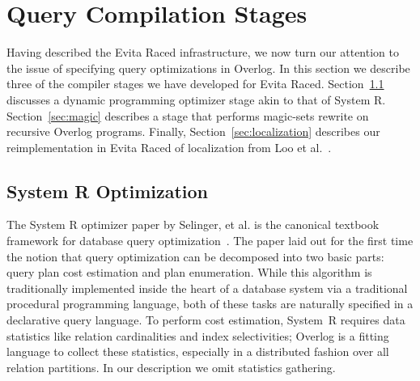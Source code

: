 \section{Query Compilation Stages}
\label{sec:rewrite}

Having described the Evita Raced infrastructure, we now turn our
attention to the issue of specifying query optimizations in Overlog.  In
this section we  describe three of the compiler stages we have developed
for Evita Raced. 
Section~\ref{sec:systemr} discusses a dynamic programming optimizer stage akin to that of
System R. Section~\ref{sec:magic} describes a stage that performs 
magic-sets rewrite on recursive Overlog programs.
Finally, Section~\ref{sec:localization} describes our
reimplementation in Evita Raced of localization  from Loo et
al.~\cite{loo-sigmod06}. 

\subsection{System R Optimization}
\label{sec:systemr}

The System R optimizer paper by Selinger, et al. is the canonical textbook framework for database query optimization~\cite{selinger}.  The paper laid out for
the first time the notion that query optimization can be decomposed
into two basic parts: query plan cost
estimation and plan enumeration.  While this algorithm is traditionally implemented inside
the heart of a database system via a traditional procedural
programming language, both of these tasks are
naturally specified in a declarative query language.  To perform cost
estimation, System~R requires data statistics like relation
cardinalities and index selectivities; Overlog is a fitting language to
collect these statistics, especially in a distributed fashion over all
relation partitions. In our description we omit statistics gathering.

